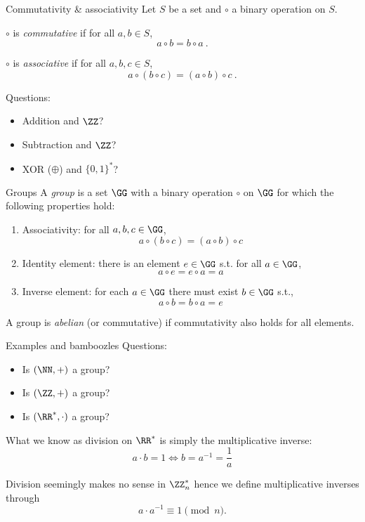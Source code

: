 \begin{frame}{Commutativity \& associativity}
  Let $S$ be a set and $\circ$ a binary operation on $S$.

  \pause
  $\circ$ is \emph{commutative} if for all $a, b\in S$,
  \[
      a \circ b = b \circ a\ .
  \]

  \pause
  $\circ$ is \emph{associative} if for all $a, b, c\in S$,
  \[
    a \circ (b \circ c) = (a \circ b) \circ c\ .
  \]

  \pause
  Questions:
  \begin{itemize}[<+(1)->]
    \item Addition and $\ZZ$?
    \item Subtraction and $\ZZ$?
    \item XOR ($\oplus$) and $\{0,1\}^*$?
  \end{itemize}
\end{frame}

\begin{frame}{Groups}
  A \emph{group} is a set $\GG$ with a binary operation $\circ$ on $\GG$ for which the following properties hold:
  \begin{enumerate}[<+(1)->]
    \item Associativity: for all $a, b, c\in \GG$,
    \[
      a \circ (b \circ c) = (a \circ b) \circ c
    \]
    \item Identity element: there is an element $e\in \GG$ s.t. for all $a\in \GG$,
    \[
      a \circ e = e \circ a = a
    \]
    \item Inverse element: for each $a\in \GG$ there must exist $b\in \GG$ s.t.,
    \[
      a \circ b = b \circ a = e
    \]
  \end{enumerate}
  \vspace*{-1em}
  \pause
  A group is \emph{abelian} (or commutative) if commutativity also holds for all elements.
\end{frame}

\begin{frame}{Examples and bamboozles}
  Questions:
  \begin{itemize}[<+(1)->]
    \item Is $(\NN, +)$ a group?
    \item Is $(\ZZ, +)$ a group?
    \item Is $(\RR^*, \cdot)$ a group?
  \end{itemize}

  \pause
  What we know as division on $\RR^*$ is simply the multiplicative inverse:
  \[
    a \cdot b = 1 \iff b = a^{-1} = \frac{1}{a}
  \]

  \pause
  Division seemingly makes no sense in $\ZZ_n^*$ hence we define multiplicative inverses through
  \[
    a\cdot a^{-1} \equiv 1 \pmod{n}.
  \]
\end{frame}

